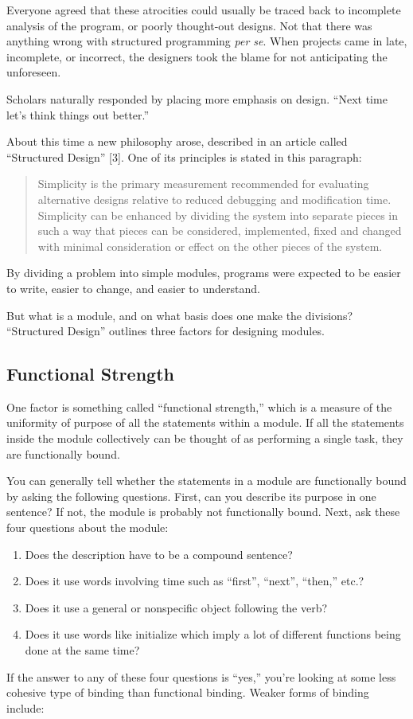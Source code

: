Everyone agreed that these atrocities could usually be traced back
to incomplete analysis of the program, or poorly thought-out designs.
Not that there was anything wrong with structured programming \emph{per
se}. When projects came in late, incomplete, or incorrect, the designers
took the blame for not anticipating the unforeseen. 

Scholars naturally responded by placing more emphasis on design. {}``Next
time let's think things out better.''

About this time a new philosophy arose, described in an article called
``Structured Design'' {[}3{]}. One of its principles is stated in
this paragraph: 

\begin{quote}
Simplicity is the primary measurement recommended for evaluating alternative
designs relative to reduced debugging and modification time. Simplicity
can be enhanced by dividing the system into separate pieces in such
a way that pieces can be considered, implemented, fixed and changed
with minimal consideration or effect on the other pieces of the system.
\end{quote}
By dividing a problem into simple modules, programs were expected
to be easier to write, easier to change, and easier to understand.

But what is a module, and on what basis does one make the divisions?
{}``Structured Design'' outlines three factors for designing modules.


\subsection{Functional Strength}
One factor is something called {}``functional strength,'' which
is a measure of the uniformity of purpose of all the statements within
a module. If all the statements inside the module collectively can
be thought of as performing a single task, they are functionally bound.

You can generally tell whether the statements in a module are functionally
bound by asking the following questions. First, can you describe its
purpose in one sentence? If not, the module is probably not functionally
bound. Next, ask these four questions about the module:

\begin{enumerate}
\item Does the description have to be a compound sentence?
\item Does it use words involving time such as {}``first'', {}``next'',
{}``then,'' etc.?
\item Does it use a general or nonspecific object following the verb?
\item Does it use words like initialize which imply a lot of different functions
being done at the same time?
\end{enumerate}
If the answer to any of these four questions is {}``yes,'' you're
looking at some less cohesive type of binding than functional binding.
Weaker forms of binding include:


